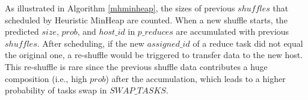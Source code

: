 As illustrated in Algorithm \ref{mhminheap}, the sizes of previous $shuffles$ that scheduled by Heuristic MinHeap are counted. 
When a new shuffle starts, the predicted $size$, $prob$, and $host\_id$ in $p\_reduces$ are accumulated with previous $shuffles$. 
After scheduling, if the new $assigned\_id$ of a reduce task did not equal the original one, a re-shuffle would be triggered to transfer data to the new host. 
This re-shuffle is rare since the previous shuffle data contributes a huge composition (i.e., high $prob$) after the accumulation, 
which leads to a higher probability of tasks swap in $SWAP\_TASKS$. 

